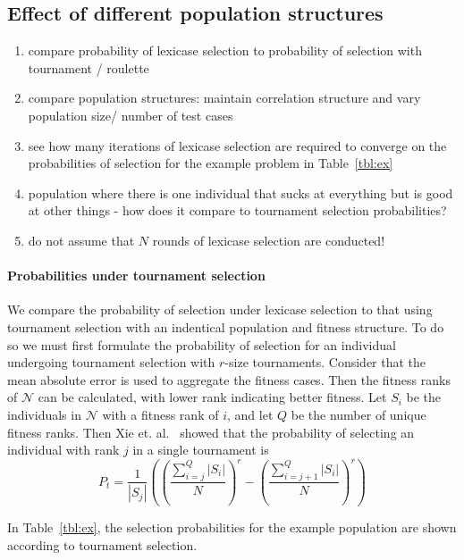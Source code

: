 \documentclass[twoside]{article}
\begin{document}
\subsection{Effect of different population structures}

\begin{enumerate}
\item compare probability of lexicase selection to probability of selection with tournament / roulette 
\item compare population structures: maintain correlation structure and vary population size/ number of test cases
\item see how many iterations of lexicase selection are required to converge on the probabilities of selection for the example problem in Table~\ref{tbl:ex}
\item population where there is one individual that sucks at everything but is good at other things - how does it compare to tournament selection probabilities?
\item do not assume that $N$ rounds of lexicase selection are conducted!
\end{enumerate}

\paragraph{Probabilities under tournament selection} We compare the probability of selection under lexicase selection to that using tournament selection with an indentical population and fitness structure. To do so we must first formulate the probability of selection for an individual undergoing tournament selection with $r$-size tournaments. Consider that the mean absolute error is used to aggregate the fitness cases. Then the fitness ranks of $\mathcal{N}$ can be calculated, with lower rank indicating better fitness. Let $S_i$ be the individuals in $\mathcal{N}$ with a fitness rank of $i$, and let $Q$ be the number of unique fitness ranks. Then Xie et. al.~\cite{xie_another_2007} showed that the probability of selecting an individual with rank $j$ in a single tournament is 
\begin{equation}
P_t = \frac{1}{|S_j|}\left( \left(\frac{\sum_{i=j}^Q{|S_i|}}{N}\right)^r - \left(\frac{\sum_{i=j+1}^Q{|S_i|}}{N}\right)^r \right)
\end{equation}

In Table~\ref{tbl:ex}, the selection probabilities for the example population are shown according to tournament selection.
\end{document}
